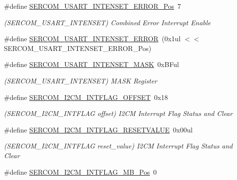 \begin{DoxyCompactItemize}
\item 
\#define \mbox{\hyperlink{group___s_a_m_d21___s_e_r_c_o_m_gaef6c1262e70469028f07779e3f71754d}{S\+E\+R\+C\+O\+M\+\_\+\+U\+S\+A\+R\+T\+\_\+\+I\+N\+T\+E\+N\+S\+E\+T\+\_\+\+E\+R\+R\+O\+R\+\_\+\+Pos}}~7
\begin{DoxyCompactList}\small\item\em (S\+E\+R\+C\+O\+M\+\_\+\+U\+S\+A\+R\+T\+\_\+\+I\+N\+T\+E\+N\+S\+ET) Combined Error Interrupt Enable \end{DoxyCompactList}\item 
\#define \mbox{\hyperlink{group___s_a_m_d21___s_e_r_c_o_m_ga5878d3d68ac0211589a65a2f557b6a0d}{S\+E\+R\+C\+O\+M\+\_\+\+U\+S\+A\+R\+T\+\_\+\+I\+N\+T\+E\+N\+S\+E\+T\+\_\+\+E\+R\+R\+OR}}~(0x1ul $<$$<$ S\+E\+R\+C\+O\+M\+\_\+\+U\+S\+A\+R\+T\+\_\+\+I\+N\+T\+E\+N\+S\+E\+T\+\_\+\+E\+R\+R\+O\+R\+\_\+\+Pos)
\item 
\#define \mbox{\hyperlink{group___s_a_m_d21___s_e_r_c_o_m_ga34a79d4eb6357ca5629b75ea0b1a1f38}{S\+E\+R\+C\+O\+M\+\_\+\+U\+S\+A\+R\+T\+\_\+\+I\+N\+T\+E\+N\+S\+E\+T\+\_\+\+M\+A\+SK}}~0x\+B\+Ful
\begin{DoxyCompactList}\small\item\em (S\+E\+R\+C\+O\+M\+\_\+\+U\+S\+A\+R\+T\+\_\+\+I\+N\+T\+E\+N\+S\+ET) M\+A\+SK Register \end{DoxyCompactList}\item 
\#define \mbox{\hyperlink{group___s_a_m_d21___s_e_r_c_o_m_ga502e9cb22a90fa745b7d4eea15d06101}{S\+E\+R\+C\+O\+M\+\_\+\+I2\+C\+M\+\_\+\+I\+N\+T\+F\+L\+A\+G\+\_\+\+O\+F\+F\+S\+ET}}~0x18
\begin{DoxyCompactList}\small\item\em (S\+E\+R\+C\+O\+M\+\_\+\+I2\+C\+M\+\_\+\+I\+N\+T\+F\+L\+AG offset) I2\+CM Interrupt Flag Status and Clear \end{DoxyCompactList}\item 
\#define \mbox{\hyperlink{group___s_a_m_d21___s_e_r_c_o_m_ga2a783802c4e63acfff748aaff1eb7efe}{S\+E\+R\+C\+O\+M\+\_\+\+I2\+C\+M\+\_\+\+I\+N\+T\+F\+L\+A\+G\+\_\+\+R\+E\+S\+E\+T\+V\+A\+L\+UE}}~0x00ul
\begin{DoxyCompactList}\small\item\em (S\+E\+R\+C\+O\+M\+\_\+\+I2\+C\+M\+\_\+\+I\+N\+T\+F\+L\+AG reset\+\_\+value) I2\+CM Interrupt Flag Status and Clear \end{DoxyCompactList}\item 
\#define \mbox{\hyperlink{group___s_a_m_d21___s_e_r_c_o_m_ga4ad2a02b2f48107fb984dc5cd3cae720}{S\+E\+R\+C\+O\+M\+\_\+\+I2\+C\+M\+\_\+\+I\+N\+T\+F\+L\+A\+G\+\_\+\+M\+B\+\_\+\+Pos}}~0
$$
\end{DoxyCompactItemize}
